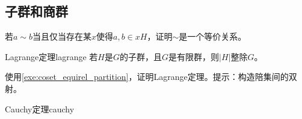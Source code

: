 \documentclass[../main.tex]{subfiles}
\begin{document}
\subsection{子群和商群}
\begin{exercise}\label{exe:coset_equirel_partition}
若$a\sim b$当且仅当存在某$x$使得$a,b\in xH$，证明$\sim$是一个等价关系。
\end{exercise}
\begin{proposition}{Lagrange定理}{lagrange}
若$H$是$G$的子群，且$G$是有限群，则$|H|$整除$G$。
\end{proposition}
\begin{exercise}
使用\ref{exe:coset_equirel_partition}，证明Lagrange定理。提示：构造陪集间的双射。
\end{exercise}
\begin{proposition}{Cauchy定理}{cauchy}

\end{proposition}
\end{document}
